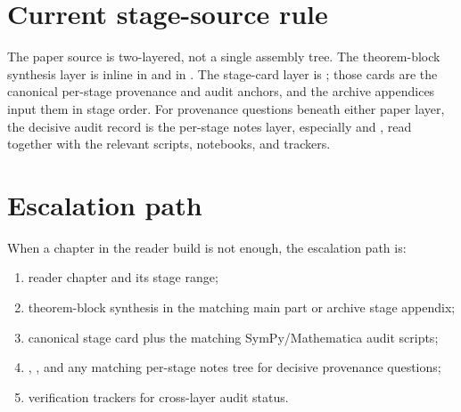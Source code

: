 \section{Current stage-source rule}

The paper source is two-layered, not a single assembly tree.  The
theorem-block synthesis layer is inline in  and in
.  The stage-card layer
is ; those cards are the canonical per-stage
provenance and audit anchors, and the archive appendices input them in stage
order.  For provenance questions beneath either paper layer, the decisive
audit record is the per-stage notes layer, especially 
and , read together with the relevant scripts,
notebooks, and trackers.

\section{Escalation path}

When a chapter in the reader build is not enough, the escalation path is:
\begin{enumerate}[leftmargin=2.2em]
  \item reader chapter and its stage range;
  \item theorem-block synthesis in the matching main part or archive stage
  appendix;
  \item canonical stage card plus the matching SymPy/Mathematica audit scripts;
  \item {}, , and any
  matching per-stage notes tree for decisive provenance questions;
  \item verification trackers for cross-layer audit status.
\end{enumerate}
